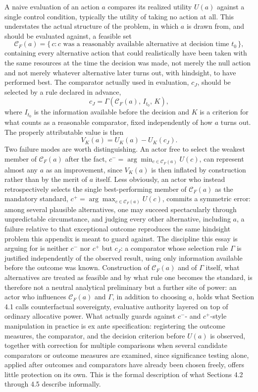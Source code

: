 \documentclass[11pt]{article}
\begin{document}
A naive evaluation of an action $a$ compares its realized utility $U(a)$ against a single control condition, typically the utility of taking no action at all. This understates the actual structure of the problem, in which $a$ is drawn from, and should be evaluated against, a feasible set
\[
\mathcal{C}_F(a) = \{\, c : c \text{ was a reasonably available alternative at decision time } t_0 \,\},
\]
containing every alternative action that could realistically have been taken with the same resources at the time the decision was made, not merely the null action and not merely whatever alternative later turns out, with hindsight, to have performed best. The comparator actually used in evaluation, $c_J$, should be selected by a rule declared in advance,
\[
c_J = \Gamma\!\left(\mathcal{C}_F(a),\, I_{t_0},\, K\right),
\]
where $I_{t_0}$ is the information available before the decision and $K$ is a criterion for what counts as a reasonable comparator, fixed independently of how $a$ turns out. The properly attributable value is then
\[
V_K(a) = U_K(a) - U_K(c_J).
\]
Two failure modes are worth distinguishing. An actor free to select the weakest member of $\mathcal{C}_F(a)$ after the fact, $c^{-} = \arg\min_{c \in \mathcal{C}_F(a)} U(c)$, can represent almost any $a$ as an improvement, since $V_K(a)$ is then inflated by construction rather than by the merit of $a$ itself. Less obviously, an actor who instead retrospectively selects the single best-performing member of $\mathcal{C}_F(a)$ as the mandatory standard, $c^{+} = \arg\max_{c \in \mathcal{C}_F(a)} U(c)$, commits a symmetric error: among several plausible alternatives, one may succeed spectacularly through unpredictable circumstance, and judging every other alternative, including $a$, a failure relative to that exceptional outcome reproduces the same hindsight problem this appendix is meant to guard against. The discipline this essay is arguing for is neither $c^{-}$ nor $c^{+}$ but $c_J$: a comparator whose selection rule $\Gamma$ is justified independently of the observed result, using only information available before the outcome was known. Construction of $\mathcal{C}_F(a)$ and of $\Gamma$ itself, what alternatives are treated as feasible and by what rule one becomes the standard, is therefore not a neutral analytical preliminary but a further site of power: an actor who influences $\mathcal{C}_F(a)$ and $\Gamma$, in addition to choosing $a$, holds what Section 4.1 calls counterfactual sovereignty, evaluative authority layered on top of ordinary allocative power. What actually guards against $c^{-}$- and $c^{+}$-style manipulation in practice is ex ante specification: registering the outcome measures, the comparator, and the decision criterion before $U(a)$ is observed, together with correction for multiple comparisons when several candidate comparators or outcome measures are examined, since significance testing alone, applied after outcomes and comparators have already been chosen freely, offers little protection on its own. This is the formal description of what Sections 4.2 through 4.5 describe informally.
\end{document}
